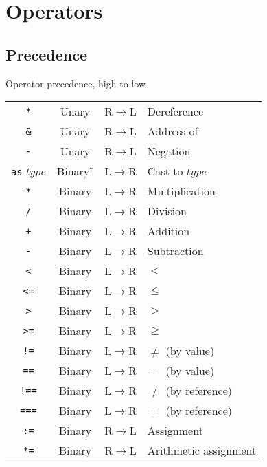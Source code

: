 \documentclass{article}
\begin{document}
\section{Operators}
\label{sec:operators}

\subsection{Precedence}
\label{sub:operators:precedence}
\begin{center}
  \begin{threeparttable}
    \caption{Operator precedence, high to low}
    \begin{tabular}{|c|c|c|l|}
      \hline
      \texttt{*} & Unary & R$\to$L & Dereference \\
      \texttt{\&} & Unary & R$\to$L & Address of \\
      \texttt{-} & Unary & R$\to$L & Negation \\ \hline
      \texttt{as} $type$ & Binary$^\dagger$ & L$\to$R & Cast to $type$ \\ \hline
      \texttt{*} & Binary & L$\to$R & Multiplication \\
      \texttt{/} & Binary & L$\to$R & Division \\ \hline
      \texttt{+} & Binary & L$\to$R & Addition \\
      \texttt{-} & Binary & L$\to$R & Subtraction \\ \hline
      \texttt{<} & Binary & L$\to$R & $<$ \\
      \texttt{<=} & Binary & L$\to$R & $\leq$ \\
      \texttt{>} & Binary & L$\to$R & $>$ \\
      \texttt{>=} & Binary & L$\to$R & $\geq$ \\ \hline
      \texttt{!=} & Binary & L$\to$R & $\not=$ (by value) \\
      \texttt{==} & Binary & L$\to$R & $=$ (by value) \\
      \texttt{!==} & Binary & L$\to$R & $\not=$ (by reference) \\
      \texttt{===} & Binary & L$\to$R & $=$ (by reference) \\ \hline
      \texttt{:=} & Binary & R$\to$L & Assignment \\
      \texttt{*=} & Binary & R$\to$L & Arithmetic assignment \\

\end{tabular}
\end{threeparttable}
\end{center}
\end{document}
